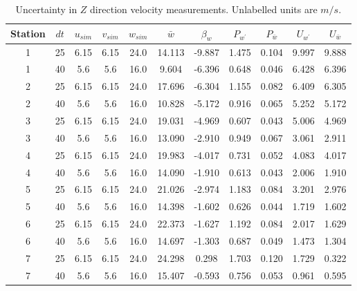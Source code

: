 \renewcommand\baselinestretch{1.3}\selectfont
\begin{table}[H]
\begin{center}
\begin{tabular}{|ccccccccccc|}
	\hline
	Station & $dt$ & $u_{sim}$ & $v_{sim}$ & $w_{sim}$ & $\bar{w}$ & $\beta_w$ & $P_{w^{\prime}}$ & $P_{\bar{w}}$ & $U_{w^{\prime}}$ & $U_{\bar{w}}$\\
	\hline
	1 & 25 & 6.15 & 6.15 & 24.0 & 14.113 & -9.887 & 1.475 & 0.104 & 9.997 & 9.888\\
	1 & 40 & 5.6 & 5.6 & 16.0 & 9.604 & -6.396 & 0.648 & 0.046 & 6.428 & 6.396\\
	2 & 25 & 6.15 & 6.15 & 24.0 & 17.696 & -6.304 & 1.155 & 0.082 & 6.409 & 6.305\\
	2 & 40 & 5.6 & 5.6 & 16.0 & 10.828 & -5.172 & 0.916 & 0.065 & 5.252 & 5.172\\
	3 & 25 & 6.15 & 6.15 & 24.0 & 19.031 & -4.969 & 0.607 & 0.043 & 5.006 & 4.969\\
	3 & 40 & 5.6 & 5.6 & 16.0 & 13.090 & -2.910 & 0.949 & 0.067 & 3.061 & 2.911\\
	4 & 25 & 6.15 & 6.15 & 24.0 & 19.983 & -4.017 & 0.731 & 0.052 & 4.083 & 4.017\\
	4 & 40 & 5.6 & 5.6 & 16.0 & 14.090 & -1.910 & 0.613 & 0.043 & 2.006 & 1.910\\
	5 & 25 & 6.15 & 6.15 & 24.0 & 21.026 & -2.974 & 1.183 & 0.084 & 3.201 & 2.976\\
	5 & 40 & 5.6 & 5.6 & 16.0 & 14.398 & -1.602 & 0.626 & 0.044 & 1.719 & 1.602\\
	6 & 25 & 6.15 & 6.15 & 24.0 & 22.373 & -1.627 & 1.192 & 0.084 & 2.017 & 1.629\\
	6 & 40 & 5.6 & 5.6 & 16.0 & 14.697 & -1.303 & 0.687 & 0.049 & 1.473 & 1.304\\
	7 & 25 & 6.15 & 6.15 & 24.0 & 24.298 & 0.298 & 1.703 & 0.120 & 1.729 & 0.322\\
	7 & 40 & 5.6 & 5.6 & 16.0 & 15.407 & -0.593 & 0.756 & 0.053 & 0.961 & 0.595\\
	\hline
\end{tabular}
\caption{Uncertainty in $Z$ direction velocity measurements. Unlabelled units are $m/s$.}
\label{table:uncertainties_w}
\end{center}
\end{table}
\renewcommand\baselinestretch{2}\selectfont

